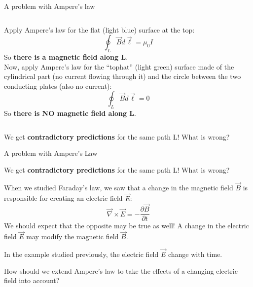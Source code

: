 \begin{frame}{A problem with Ampere's law}
\begin{columns}
\begin{column}{0.70\textwidth}
{      Apply Ampere's law for the flat (light blue) surface at the top:
      \begin{equation*}
          \oint_{L} \vec{B} d\vec{\ell} = \mu_{0} I
     \end{equation*}
     So {\bf there is a magnetic field along L}.\\
     \vspace{0.2cm}
      Now, apply Ampere's law for the ``tophat'' (light green) surface
      made of the cylindrical part (no current flowing through it) and the
      circle between the two conducting plates (also no current):
      \begin{equation*}
          \oint_{L} \vec{B} d\vec{\ell} = 0
     \end{equation*}
     So {\bf there is NO magnetic field along L}.\\
   }
  \end{column}
\end{columns}

\vspace{0.3cm}

We get {\bf contradictory predictions} for the same path L! What is wrong?

\end{frame}

%
%
%

\begin{frame}{A problem with Ampere's Law}

We get {\bf contradictory predictions} for the same path L! What is wrong?\\
\vspace{0.3cm}

When we studied Faraday's law, we saw that a change in the magnetic field $\vec{B}$
is responsible for creating an electric field $\vec{E}$:
\begin{equation*}
  \vec{\nabla} \times \vec{E} = -\frac{\partial \vec{B}}{\partial t}
\end{equation*}
We should expect that the opposite may be true as well!
A change in the electric field $\vec{E}$ may modify the magnetic field $\vec{B}$.\\

\vspace{0.3cm}

In the example studied previously, the electric field $\vec{E}$ change with time.

\vspace{0.2cm}

How should we extend Ampere's law to take the effects of a changing electric field into account?

\end{frame}

